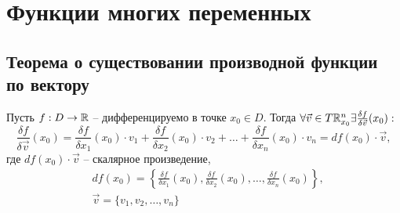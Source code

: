 \section{Функции многих переменных}

\setcounter{subsection}{1}

\subsection{Теорема о существовании производной функции по вектору}

\begin{statement}
    Пусть $ f:D\rightarrow\mathbb{R} $ -- дифференцируемо в точке $ x_0\in D $. Тогда $ \forall \vec{v}\in T\mathbb{R}_{x_0}^n \exists \frac{\delta f}{\delta \vec{v}}(x_0):$
    \[
        \frac{\delta f}{\delta \vec{v}}(x_0) = \frac{\delta f}{\delta x_1}(x_0) \cdot v_1 + \frac{\delta f}{\delta x_2}(x_0) \cdot v_2 + \ldots +\frac{\delta f}{\delta x_n}(x_0) \cdot v_n = df(x_0)\cdot \vec{v},
    \] где $df(x_0)\cdot \vec{v}$ -- скалярное произведение,
    \begin{align*}
         & df(x_0) = \left\{\frac{\delta f}{\delta x_1}(x_0), \frac{\delta f}{\delta x_2}(x_0), \ldots, \frac{\delta f}{\delta x_n}(x_0)\right\}, \\
         & \vec{v} = \{v_1,v_2,\ldots,v_n\}
    \end{align*}
\end{statement}

